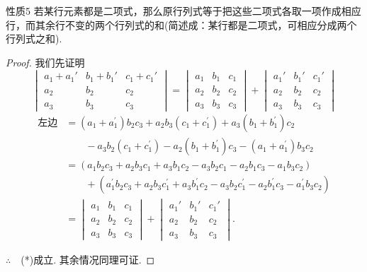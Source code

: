 \begin{thm}
  {性质5} 若某行元素都是二项式，那么原行列式等于把这些二项式各取一项作成相应行，而其余行不变的两个行列式的和(简述成：某行都是二项式，可相应分成两个行列式之和).
\end{thm}

\begin{proof}
  我们先证明
\begin{equation}
  \begin{vmatrix}a_1+a_1'&b_1+b_1'&c_1+c_1'\\a_2&b_2&c_2\\a_3&b_3&c_3\end{vmatrix}=\begin{vmatrix}a_1&b_1&c_1\\a_2&b_2&c_2\\a_3&b_3&c_3\end{vmatrix}+\begin{vmatrix}{a_1}'&{b_1}'&{c_1}'\\{a_2}&{b_2}&{c_2}\\{a_3}&{b_3}&{c_3}\end{vmatrix}\tag{*}
\end{equation}
\[\begin{split}
  \text{左边}&=(a_{1}+a_{1}^{\prime})b_{2}c_{3}+a_{2}b_{3}(c_{1}+c_{1}^{\prime})+a_{3}(b_{1}+b_{1}^{\prime})c_{2}\\
&\qquad -a_{3}b_{2}(c_{1}+c_{1}^{\prime})-a_{2}(b_{1}+b_{1}^{\prime})c_{3}-(a_{1}+a_{1}^{\prime})b_{3}c_{2}\\
&=(a_{1}b_{2}c_{3}+a_{2}b_{3}c_{1}+a_{3}b_{1}c_{2}-a_{3}b_{2}c_{1}-a_{2}b_{1}c_{3}-a_{1}b_{3}c_{2})\\
&\qquad +(a_{1}^{\prime}b_{2}c_{3}+a_{2}b_{3}c_{1}^{\prime}+a_{3}b_{1}^{\prime}c_{2}-a_{3}b_{2}c_{1}^{\prime}-a_{2}b_{1}^{\prime}c_{3}-a_{1}^{\prime}b_{3}c_{2})\\
&=\begin{vmatrix}a_1&b_1&c_1\\a_2&b_2&c_2\\a_3&b_3&c_3\end{vmatrix}+\begin{vmatrix}{a_1}'&{b_1}'&{c_1}'\\{a_2}&{b_2}&{c_2}\\{a_3}&{b_3}&{c_3}\end{vmatrix}.
\end{split}\]

$\therefore\quad $(*)成立. 其余情况同理可证.
\end{proof}

